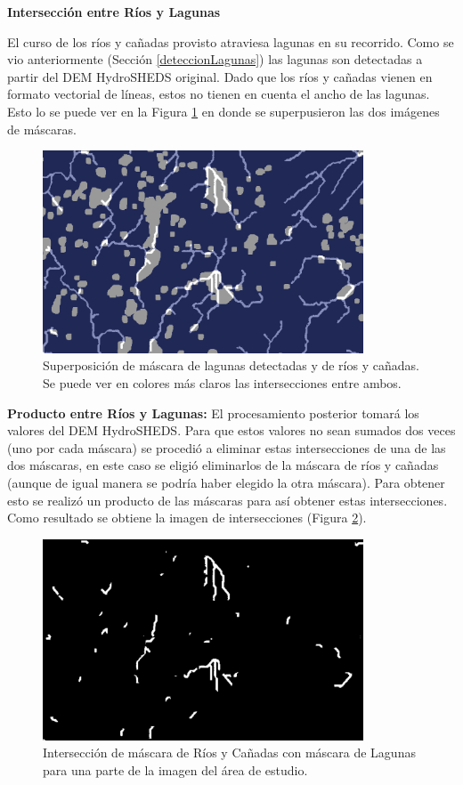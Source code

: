 \documentclass[10pt,a4paper, twoside]{report}
\begin{document}
\textbf{Intersección entre Ríos y Lagunas}

El curso de los ríos y cañadas provisto atraviesa lagunas en su recorrido. Como se vio anteriormente (Sección \ref{deteccionLagunas}) las lagunas son detectadas a partir del DEM HydroSHEDS original. Dado que los ríos y cañadas vienen en formato vectorial de líneas, estos no tienen en cuenta el ancho de las lagunas. Esto lo se puede ver en la Figura \ref{lagunasSobreRios} en donde se superpusieron las dos imágenes de máscaras.

\begin{figure}[H]
   \centering      
   \includegraphics[width=0.85\textwidth]{imagenes/lagunasSobreRios.jpg}
 \caption{Superposición de máscara de lagunas detectadas y de ríos y cañadas. Se puede ver en colores más claros las intersecciones entre ambos.}
 \label{lagunasSobreRios}
\end{figure}

\textbf{Producto entre Ríos y Lagunas:} El procesamiento posterior tomará los valores del DEM HydroSHEDS. Para que estos valores no sean sumados dos veces (uno por cada máscara) se procedió a eliminar estas intersecciones de una de las dos máscaras, en este caso se eligió eliminarlos de la máscara de ríos y cañadas (aunque de igual manera se podría haber elegido la otra máscara). Para obtener esto se realizó un producto de las máscaras para así obtener estas intersecciones. Como resultado se obtiene la imagen de intersecciones (Figura \ref{interseccionLagunasCañadas}).

\begin{figure}[H]
   \centering      
   \includegraphics[width=0.85\textwidth]{imagenes/interseccionLagunasCanadas.jpg}
 \caption{Intersección de máscara de Ríos y Cañadas con máscara de Lagunas para una parte de la imagen del área de estudio.}
 \label{interseccionLagunasCañadas}
\end{figure}
\end{document}
